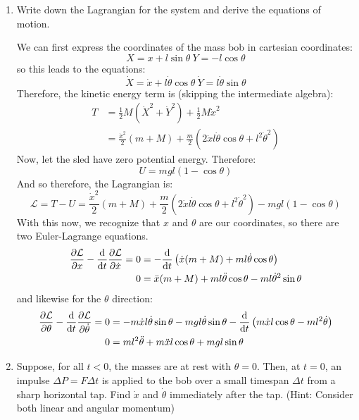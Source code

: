 \documentclass[10pt]{article}
\begin{document}
        \begin{enumerate}[label=(\alph*)]
            \item Write down the Lagrangian for the system and derive the equations of motion. 
            
            \begin{solution}
                We can first express the coordinates of the mass bob in cartesian coordinates:
                \[ X = x + l \sin \theta \ Y = -l \cos \theta\]
                so this leads to the equations:
                \[ \dot X = \dot x + l\dot \theta \cos \theta \ \dot Y = l\dot \theta \sin \theta\]
                Therefore, the kinetic energy term is (skipping the intermediate algebra): 
                \begin{align*}
                    T &= \frac 12 M (\dot X^2 + \dot Y^2) + \frac 12 M \dot x^2 \\
                    &= \frac{\dot x^2}{2}(m + M) + \frac{m}{2} \left( 2 \dot x l \dot \theta \cos \theta + l^2 \dot \theta^2\right)
                \end{align*}
                Now, let the sled have zero potential energy. Therefore: 
                \[ U = mgl(1 - \cos \theta)\] 
                And so therefore, the Lagrangian is:
                \[ \mathcal L = T - U = \frac{\dot x^2}{2}(m + M) + \frac{m}{2} \left( 2 \dot x l \dot \theta \cos \theta + l^2 \dot \theta^2\right) - mgl(1 - \cos \theta)\]
                With this now, we recognize that $x$ and $\theta$ are our coordinates, so there are two Euler-Lagrange equations. 
                \begin{align*}
                    \pdv{\mathcal L}{x} - \dv{t}\pdv{\mathcal L}{\dot x} =0 &= -\dv{t}\left( \dot x(m + M) + ml\dot\theta \cos \theta\right)\\
                    0 &= \ddot x(m + M) + ml \ddot \theta \cos \theta - ml \dot \theta^2 \sin \theta
                \end{align*}
                and likewise for the $\theta$ direction:
                \begin{align*}
                    \pdv{\mathcal L}{\theta} - \dv{t}\pdv{\mathcal L}{\dot \theta} = 0 &= -m \dot x l \dot \theta \sin \theta - mgl \dot \theta \sin \theta - \dv{t}\left( m \dot x l \cos \theta - m l^2 \dot \theta\right)\\
                    0 &= ml^2 \ddot \theta + m\ddot x l \cos \theta + mgl \sin \theta
                \end{align*}
            \end{solution}
            \item Suppose, for all $t < 0$, the masses are at rest with $\theta = 0$. Then, at $t = 0$, an impulse $\Delta P = F\Delta t$ is applied to the bob over a small timespan $\Delta t$ from a sharp horizontal tap. Find $\dot x$ and $\dot \theta$ immediately after the tap. (Hint: Consider both linear and angular momentum)
            

\end{enumerate}
\end{document}
